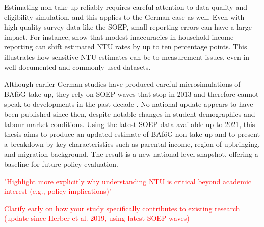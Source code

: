 Estimating non-take-up reliably requires careful attention to data quality and eligibility simulation, and this applies to the German case as well. Even with high-quality survey data like the SOEP, small reporting errors can have a large impact. For instance, \citet{frick_claim_2007} show that modest inaccuracies in household income reporting can shift estimated NTU rates by up to ten percentage points. This illustrates how sensitive NTU estimates can be to measurement issues, even in well-documented and commonly used datasets.

Although earlier German studies have produced careful microsimulations of BAföG take-up, they rely on SOEP waves that stop in 2013 and therefore cannot speak to developments in the past decade \citep{herber_non-take-up_2019, bruckmeier_new_2012}. No national update appears to have been published since then, despite notable changes in student demographics and labour-market conditions. Using the latest SOEP data available up to 2021, this thesis aims to produce an updated estimate of BAföG non-take-up and to present a breakdown by key characteristics such as parental income, region of upbringing, and migration background. The result is a new national-level snapshot, offering a baseline for future policy evaluation.

\textcolor{red}{"Highlight more explicitly why understanding NTU is critical beyond academic interest (e.g., policy implications)"}

\textcolor{red}{Clarify early on how your study specifically contributes to existing research (update since Herber et al. 2019, using latest SOEP waves)}
